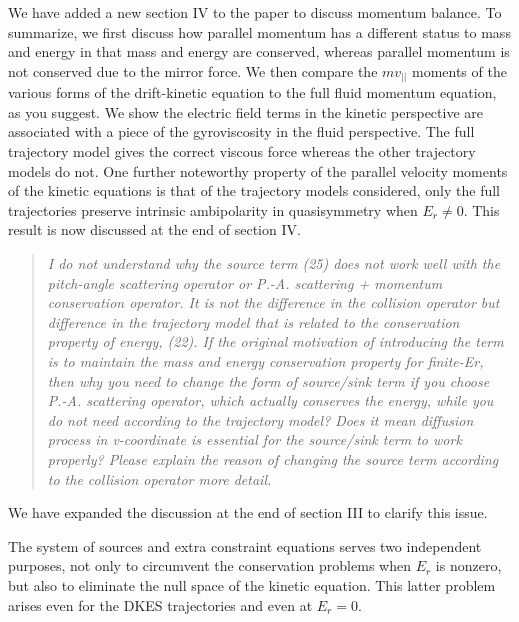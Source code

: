 \documentclass[11pt]{article}
\newenvironment{referee}{\begin{quote}\it\color{Blue}}{\end{quote}}
\begin{document}
We have added a new section IV to the paper to discuss momentum balance.
To summarize, we first discuss how parallel momentum has a different status to mass and energy in that mass and
energy are conserved, whereas parallel momentum is not conserved due to the mirror force.
We then compare the $m v_{||}$ moments of the various forms of the drift-kinetic
equation to the full fluid momentum equation, as you suggest.
We show the electric field terms in the kinetic perspective
are associated with a piece of the gyroviscosity in the fluid perspective.  The full trajectory model
gives the correct viscous force whereas the other trajectory models do not.
One further noteworthy property of the parallel velocity moments of the kinetic equations
is that of the trajectory models considered, only the full trajectories preserve intrinsic
ambipolarity in quasisymmetry when $E_r \ne 0$. This result is now discussed at the end of section IV.

\begin{referee}
I do not understand why the source term (25) does not work well with the pitch-angle scattering
operator or P.-A. scattering + momentum conservation operator. It is not the difference in the
collision operator but difference in the trajectory model that is related to the conservation
property of energy, (22). If the original motivation of introducing the term is to maintain the
mass and energy conservation property for finite-Er, then why you need to change the form of
source/sink term if you choose P.-A. scattering operator, which actually conserves the energy,
while you do not need according to the trajectory model? Does it mean diffusion process in
v-coordinate is essential for the source/sink term to work properly?
Please explain the reason of changing the source term according to the collision operator more
detail.
\end{referee}

We have expanded the discussion at the end of section III to clarify this issue.

The system of sources and extra constraint equations serves two independent purposes,
not only to circumvent the conservation problems when $E_r$ is nonzero, but also to eliminate the null
space of the kinetic equation. This latter problem arises even for the DKES trajectories 
and even at $E_r=0$.  
\end{document}
